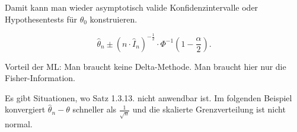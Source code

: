\documentclass[10pt]{article}
\newenvironment{BSP}[1][]
{\begin{Beispiel}[frametitle=#1]}{\end{Beispiel}}
\begin{document}
	Damit kann man wieder asymptotisch valide Konfidenzintervalle oder Hypothesentests für $\theta_0$ konstruieren. 
	\begin{BSP}[Beispiel 1.3.10 (Konfidenzintervall für $\theta_0$)]
		\begin{equation*}
			\hat{\theta}_n \pm (n \cdot \hat{I}_n)^{-\frac{1}{2}} \cdot \Phi^{-1}\left(1-\frac{\alpha}{2}\right).
		\end{equation*}
	\end{BSP}
	Vorteil der ML: Man braucht keine Delta-Methode. Man braucht hier nur die Fisher-Information. 
	
	Es gibt Situationen, wo Satz 1.3.13. nicht anwendbar ist. Im folgenden Beispiel konvergiert $\hat{\theta}_n - \theta$ schneller als $\frac{1}{\sqrt{n}}$ und die skalierte Grenzverteilung ist nicht normal. 
	
\end{document}
